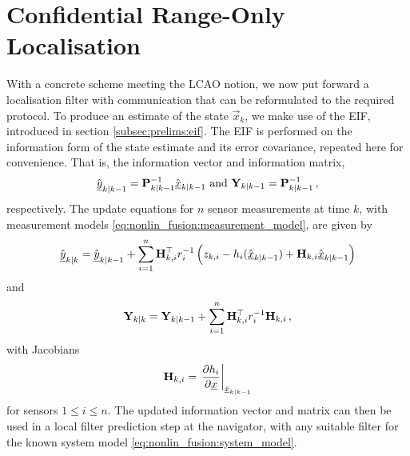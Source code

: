 \section{Confidential Range-Only Localisation}\label{sec:nonlin_fusion:conf_range_only_localisation}
With a concrete scheme meeting the LCAO notion, we now put forward a localisation filter with communication that can be reformulated to the required protocol. To produce an estimate of the state $\vec{x}_k$, we make use of the EIF, introduced in section \ref{subsec:prelims:eif}. The EIF is performed on the information form of the state estimate and its error covariance, repeated here for convenience. That is, the information vector and information matrix,
\begin{equation}\label{eq:nonlin_fusion:eif_info_vec_info_mat}
    \hat{{\underline{y}}}_{k|k-1} = {{\mathbf{P}}}_{k|k-1}^{-1}\hat{{\underline{x}}}_{k|k-1} \text{ and } {\ensuremath{{\mathbf{Y}}}}_{k|k-1} = {{\mathbf{P}}}_{k|k-1}^{-1}\,,
\end{equation}
respectively. The update equations for $n$ sensor measurements at time $k$, with measurement models \eqref{eq:nonlin_fusion:measurement_model}, are given by
\begin{equation}\label{eq:nonlin_fusion:eif_info_vec_update}
        \hat{{\underline{y}}}_{k|k} = \hat{{\underline{y}}}_{k|k-1} +  \sum^n_{i=1}{{\mathbf{H}}}^\top_{k,i} r^{-1}_i \left(z_{k,i} - h_i(\hat{{\underline{x}}}_{k|k-1}) + {{\mathbf{H}}}_{k,i}\hat{{\underline{x}}}_{k|k-1}\right)
\end{equation}
and
\begin{equation}\label{eq:nonlin_fusion:eif_info_mat_update}
    {\ensuremath{{\mathbf{Y}}}}_{k|k} = {{\mathbf{Y}}}_{k|k-1} + \sum^n_{i=1}{{\mathbf{H}}}^\top_{k,i} r^{-1}_i {{\mathbf{H}}}_{k,i}\,,
\end{equation}
with Jacobians
\begin{equation}\label{eq:nonlin_fusion:measurement_jacobian}
    {\ensuremath{{\mathbf{H}}}}_{k,i} = \left.\frac{\partial h_i}{\partial {\underline{x}}}\right|_{\hat{{\underline{x}}}_{k|k-1}}
\end{equation}
for sensors $1\leq i\leq n$. The updated information vector and matrix can then be used in a local filter prediction step at the navigator, with any suitable filter for the known system model \eqref{eq:nonlin_fusion:system_model}.

